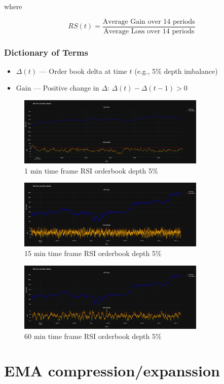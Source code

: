 \documentclass[12pt]{article}
\begin{document}
where

\[
RS(t) = \frac{\text{Average Gain over 14 periods}}{\text{Average Loss over 14 periods}}
\]


\subsubsection*{Dictionary of Terms}

\begin{itemize}
  \item $\Delta(t)$ — Order book delta at time $t$ (e.g., 5\% depth imbalance)
  \item $\text{Gain}$ — Positive change in $\Delta$: $\Delta(t) - \Delta(t-1) > 0$

\end{itemize}

\begin{figure}[H]
    \centering
    \includegraphics[width=0.8\textwidth]{imgs/RSI1min.png}
    \caption{1 min time frame RSI orderbook depth 5\%}    
\end{figure}
\begin{figure}[H]
    \centering
    \includegraphics[width=0.8\textwidth]{imgs/15minRsi.png}
    \caption{15 min time frame RSI orderbook depth 5\%}
\end{figure}

\begin{figure}[H]
    \centering
    \includegraphics[width=0.8\textwidth]{imgs/60minRSI.png}
    \caption{60 min time frame RSI orderbook depth 5\%}
\end{figure}




\section*{EMA compression/expanssion}
\end{document}
